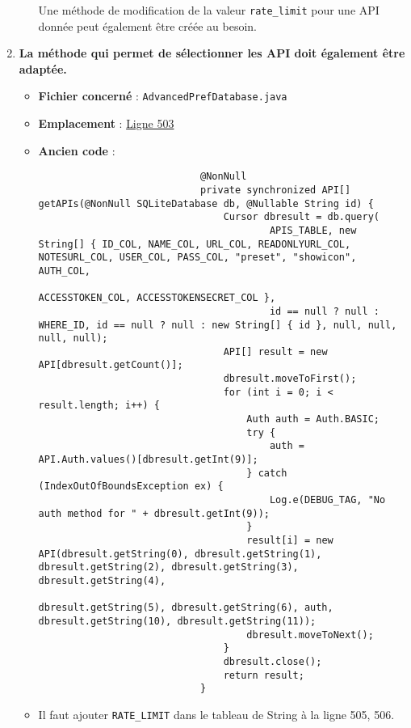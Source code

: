 \begin{enumerate}
\begin{itemize}
                    Une méthode de modification de la valeur \texttt{rate_limit} pour une API donnée peut également être créée au besoin.
          \end{itemize}
    \item \textbf{La méthode qui permet de sélectionner les API doit également être adaptée.}
          \begin{itemize}
              \item \textbf{Fichier concerné} : \texttt{AdvancedPrefDatabase.java}
              \item \textbf{Emplacement} :
                    \href{https://github.com/MarcusWolschon/osmeditor4android/blob/127fb689ad42c77558e4512e14de754e0561cd27/src/main/java/de/blau/android/prefs/AdvancedPrefDatabase.java#L503}{Ligne 503}
              \item \textbf{Ancien code} :
                    \begin{verbatim}
                            @NonNull
                            private synchronized API[] getAPIs(@NonNull SQLiteDatabase db, @Nullable String id) {
                                Cursor dbresult = db.query(
                                        APIS_TABLE, new String[] { ID_COL, NAME_COL, URL_COL, READONLYURL_COL, NOTESURL_COL, USER_COL, PASS_COL, "preset", "showicon", AUTH_COL,
                                                ACCESSTOKEN_COL, ACCESSTOKENSECRET_COL },
                                        id == null ? null : WHERE_ID, id == null ? null : new String[] { id }, null, null, null, null);
                                API[] result = new API[dbresult.getCount()];
                                dbresult.moveToFirst();
                                for (int i = 0; i < result.length; i++) {
                                    Auth auth = Auth.BASIC;
                                    try {
                                        auth = API.Auth.values()[dbresult.getInt(9)];
                                    } catch (IndexOutOfBoundsException ex) {
                                        Log.e(DEBUG_TAG, "No auth method for " + dbresult.getInt(9));
                                    }
                                    result[i] = new API(dbresult.getString(0), dbresult.getString(1), dbresult.getString(2), dbresult.getString(3), dbresult.getString(4),
                                            dbresult.getString(5), dbresult.getString(6), auth, dbresult.getString(10), dbresult.getString(11));
                                    dbresult.moveToNext();
                                }
                                dbresult.close();
                                return result;
                            }
                          \end{verbatim}
              \item Il faut ajouter \texttt{RATE_LIMIT} dans le tableau de String à la ligne 505, 506.


\end{itemize}
\end{enumerate}
